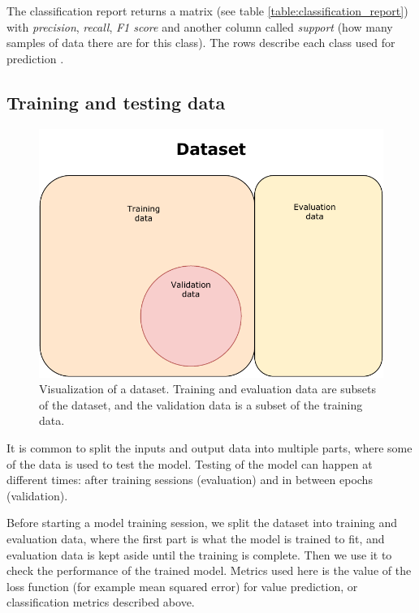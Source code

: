 The classification report returns a matrix (see table \ref{table:classification_report}) with \textit{precision}, \textit{recall}, \textit{F1 score} and another column called \textit{support} (how many samples of data there are for this class). The rows describe each class used for prediction \cite{sklearn_classification_report}.

\subsection{Training and testing data}
\begin{figure}
  \includegraphics{img/train_test_data.pdf}
  \caption{Visualization of a dataset. Training and evaluation data are subsets of the dataset, and the validation data is a subset of the training data.}
  \label{figure:dataset_train_test}
\end{figure}

It is common to split the inputs and output data into multiple parts, where some of the data is used to test the model. Testing of the model can happen at different times: after training sessions (evaluation) and in between epochs (validation). 

Before starting a model training session, we split the dataset into training and evaluation data, where the first part is what the model is trained to fit, and evaluation data is kept aside until the training is complete. Then we use it to check the performance of the trained model. Metrics used here is the value of the loss function (for example mean squared error) for value prediction, or classification metrics described above.

